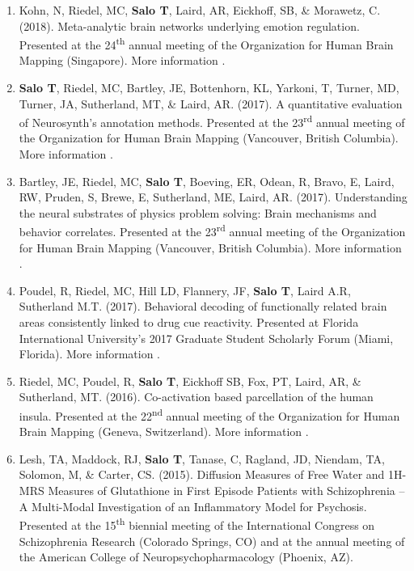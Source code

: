 \documentclass[10pt]{article}
\newcommand{\textlink}[3][blue]{\href{#2}{\color{#1}{#3}}}
\begin{document}
\begin{enumerate}
	\item Kohn, N, Riedel, MC, \textbf{Salo T}, Laird, AR, Eickhoff, SB,
	\& Morawetz, C. (2018).
	Meta-analytic brain networks underlying emotion regulation.
	Presented at the 24\textsuperscript{th} annual meeting of the Organization
	for Human Brain Mapping (Singapore).
	More information
	\textlink{https://ww5.aievolution.com/hbm1801/index.cfm?do=abs.viewAbs&abs=1262}{here}.

	\item \textbf{Salo T}, Riedel, MC, Bartley, JE, Bottenhorn, KL, Yarkoni, T,
	Turner, MD, Turner, JA, Sutherland, MT, \& Laird, AR. (2017).
	A quantitative evaluation of Neurosynth's annotation methods. Presented at
	the 23\textsuperscript{rd} annual meeting of the Organization for Human Brain
	Mapping (Vancouver, British Columbia).
	More information
	\textlink{https://nbclab.github.io/posters/salo-neurosynth-poster}{here}.

	\item Bartley, JE, Riedel, MC, \textbf{Salo T}, Boeving, ER, Odean, R,
	Bravo, E, Laird, RW, Pruden, S, Brewe, E, Sutherland, ME,
	Laird, AR. (2017).
	Understanding the neural substrates of physics problem solving: Brain
	mechanisms and behavior correlates. Presented at the 23\textsuperscript{rd}
	annual meeting of the Organization for Human Brain Mapping (Vancouver, British
	Columbia).
	More information
	\textlink{https://nbclab.github.io/posters/bartley-physics-poster}{here}.

	\item Poudel, R,  Riedel, MC, Hill LD, Flannery, JF, \textbf{Salo T},
	Laird A.R, Sutherland M.T. (2017).
	Behavioral decoding of functionally related brain areas consistently linked
	to drug cue reactivity.
	Presented at Florida International University's 2017 Graduate Student
	Scholarly Forum (Miami, Florida).
	More information
	\textlink{https://nbclab.github.io/posters/poudel-cue-reactivity-poster}{here}.

	\item Riedel, MC, Poudel, R, \textbf{Salo T}, Eickhoff SB, Fox, PT,
	Laird, AR, \& Sutherland, MT. (2016).
	Co-activation based parcellation of the human insula.
	Presented at the 22\textsuperscript{nd} annual meeting of the Organization
	for Human Brain Mapping (Geneva, Switzerland).
	More information
	\textlink{https://osf.io/pqvqy}{here}.

	\item Lesh, TA, Maddock, RJ, \textbf{Salo T}, Tanase, C, Ragland, JD,
	Niendam, TA, Solomon, M, \& Carter, CS. (2015).
	Diffusion Measures of Free Water and 1H-MRS Measures of Glutathione in First
	Episode Patients with Schizophrenia -- A Multi-Modal Investigation of an
	Inflammatory Model for Psychosis.
	Presented at the 15\textsuperscript{th} biennial meeting of the International
	Congress on Schizophrenia Research (Colorado Springs, CO) and at
	the annual meeting of the American College of Neuropsychopharmacology
	(Phoenix, AZ).


\end{enumerate}
\end{document}
